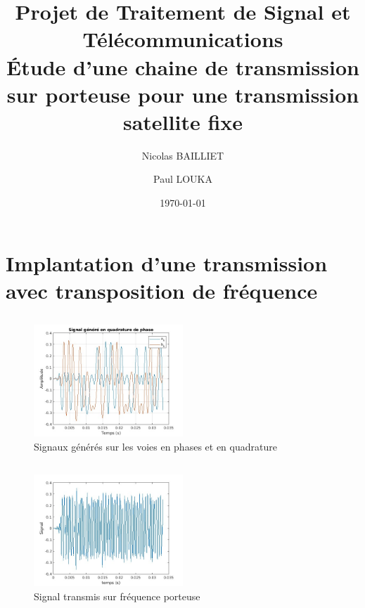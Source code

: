 \documentclass[a4paper, 12pt]{article}
\title{Projet de Traitement de Signal et Télécommunications \\
\Large Étude d’une chaine de transmission sur porteuse pour une transmission
satellite ﬁxe}
\author{Nicolas BAILLIET \and Paul LOUKA}
\date{\today}
\begin{document}
\maketitle
\tableofcontents

\clearpage
\section{Implantation d'une transmission avec transposition de fréquence}

\subsection{}

\begin{figure}[H]
    \centering
    \includegraphics[width=0.5\textwidth]{graphics/1-1.jpg}
    \caption{Signaux générés sur les voies en phases et en quadrature}
    \label{fig:mon_etiquette}
\end{figure}

\subsection{}
\begin{figure}[H]
    \centering
    \includegraphics[width=0.5\textwidth]{graphics/1-2.jpg}
    \caption{Signal transmis sur fréquence porteuse}
    \label{fig:mon_etiquette}
\end{figure}

\subsection{}
\end{document}

